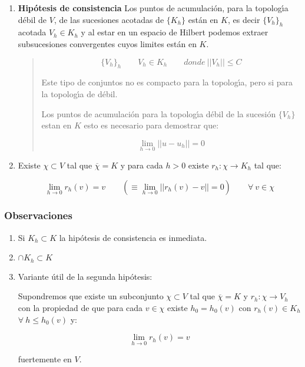\begin{enumerate}
\item \textbf{Hip\'otesis de consistencia}\newline
Los puntos de acumulaci\'on, para la topolog\'{\i}a d\'ebil de $V$, de las
sucesiones acotadas de $\{K_h \}$ est\'an en $K$, es decir $\{ V_h\}_h$ acotada
$V_h \in K_h$ y al estar en un espacio de Hilbert podemos extraer subsucesiones
convergentes cuyos limites est\'an en $K$.

\begin{quote}
\begin{displaymath}
\{V_h \}_h \qquad V_h \in K_h \qquad donde \ ||V_h|| \le C
\end{displaymath}

Este tipo de conjuntos no es compacto para la topolog\'{\i}a, pero si para la
topolog\'{\i}a de d\'ebil.\newline

Los puntos de acumulaci\'on para la topolog\'{\i}a d\'ebil de la sucesi\'on
$\{V_h \}$ estan en $K$ esto es necesario para demostrar que:

\begin{displaymath}
\lim_{h \to 0} ||u-u_h|| = 0
\end{displaymath}

\end{quote}

\item Existe $\chi \subset V$ tal que $\overline{\chi}=K$ y para cada $h>0$
existe $r_h : \chi \longrightarrow K_h$ tal que:

\begin{displaymath}
\lim_{h \to 0} r_h (v) = v \qquad (\equiv \lim_{h \to 0}
||r_h (v)-v||=0) \qquad \forall \ v \in \chi
\end{displaymath}

\end{enumerate}

\newpage

\subsubsection{Observaciones}

\begin{enumerate}
\item Si $K_h \subset K$ la hip\'otesis de consistencia es inmediata.
\item $\cap K_h \subset K$
\item Variante \'util de la segunda hip\'otesis:\newline

Supondremos que existe un subconjunto $\chi \subset V$ tal que
$\overline{\chi} = K$ y $r_h : \chi \longrightarrow V_h$ con la
propiedad de que para cada $v \in \chi$ existe $h_0 = h_0(v)$ con
$r_h (v) \in K_h$ $\forall \ h \le h_0(v)$ y:

\begin{displaymath}
\lim_{h \to 0} r_h (v) = v
\end{displaymath}

fuertemente en $V$.

\end{enumerate}

